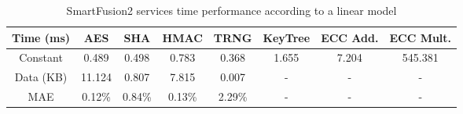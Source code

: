 \begin{table}[h!]
\centering
\def\arraystretch{1.5}
\begin{tabular}{|c|c|c|c|c|c|c|c|}
\hline
Time (ms) & AES    & SHA    & HMAC   & TRNG   & KeyTree & ECC Add. & ECC Mult.	\\ \hline
Constant  & 0.489  & 0.498  & 0.783  & 0.368  & 1.655   & 7.204    & 545.381	\\ \hline
Data (KB) & 11.124 & 0.807  & 7.815  & 0.007  & -       & -	   & -		\\ \hline
MAE       & 0.12\% & 0.84\% & 0.13\% & 2.29\% & -       & -	   & -		\\ \hline
\end{tabular}
\caption{SmartFusion2 services time performance according to a linear model}
\label{tab:core-model}
\end{table}
